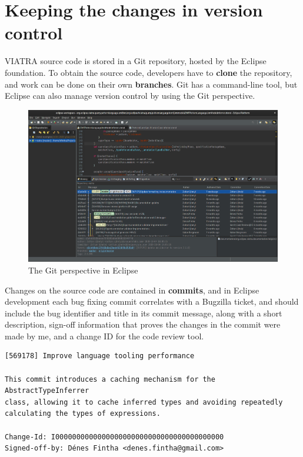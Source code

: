 \documentclass[11pt,a4paper,oneside]{report}
\begin{document}
\section{Keeping the changes in version control}
VIATRA source code is stored in a Git repository, hosted by the Eclipse
foundation. To obtain the source code, developers have to \textbf{clone} the
repository, and work can be done on their own \textbf{branches}. Git has a
command-line tool, but Eclipse can also manage version control by using the
Git perspective.

\begin{figure}[ht]
\centering
\includegraphics[width=150mm, keepaspectratio]{figures/eclipse-git.png}
\caption{The Git perspective in Eclipse}
\label{fig:eclipse-git}
\end{figure}

Changes on the source code are contained in \textbf{commits}, and in Eclipse
development each bug fixing commit correlates with a Bugzilla ticket, and
should include the bug identifier and title in its commit message, along with
a short description, sign-off information that proves the changes in the commit
were made by me, and a change ID for the code review tool.

\begin{lstlisting}
[569178] Improve language tooling performance

This commit introduces a caching mechanism for the AbstractTypeInferrer
class, allowing it to cache inferred types and avoiding repeatedly
calculating the types of expressions.

Change-Id: I0000000000000000000000000000000000000000
Signed-off-by: Dénes Fintha <denes.fintha@gmail.com>
\end{lstlisting}
\end{document}
